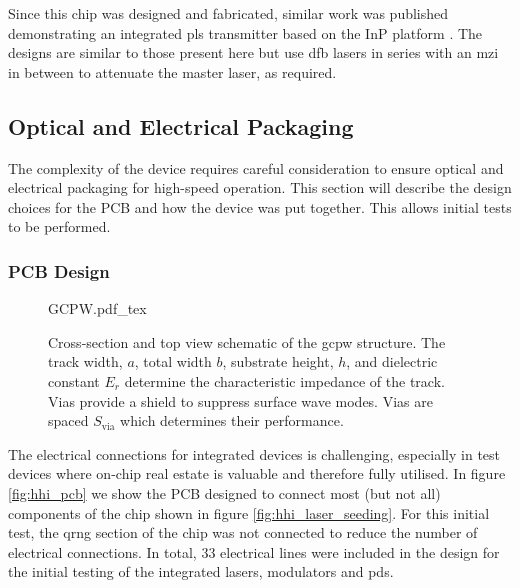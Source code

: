 
Since this chip was designed and fabricated, similar work was published demonstrating an integrated \ac{pls} transmitter based on the \ac{InP} platform \cite{paraiso2019}. The designs are similar to those present here but use \ac{dfb} lasers in series with an \ac{mzi} in between to attenuate the master laser, as required. 

\subsection{Optical and Electrical Packaging}

The complexity of the device requires careful consideration to ensure optical and electrical packaging for high-speed operation. This section will describe the design choices for the PCB and how the device was put together. This allows initial tests to be performed.


\subsubsection*{PCB Design}

\begin{figure}[t]
	\centering	
	\def\svgwidth{\textwidth} 
	{GCPW.pdf_tex}
	\caption[Grounded coplanar waveguide schematic]{Cross-section and top view schematic of the \acf{gcpw} structure. The track width, $a$, total width $b$, substrate height, $h$, and dielectric constant $E_r$ determine the characteristic impedance of the track. Vias provide a shield to suppress surface wave modes. Vias are spaced $S_\text{via}$ which determines their performance.}
	\label{fig:gcpw}
\end{figure}

The electrical connections for integrated devices is challenging, especially in test devices where on-chip real estate is valuable and therefore fully utilised. In figure \ref{fig:hhi_pcb} we show the PCB designed to connect most (but not all) components of the chip shown in figure \ref{fig:hhi_laser_seeding}. For this initial test, the \ac{qrng} section of the chip was not connected to reduce the number of electrical connections. In total, 33 electrical lines were included in the design for the initial testing of the integrated lasers, modulators and \acp{pd}.

